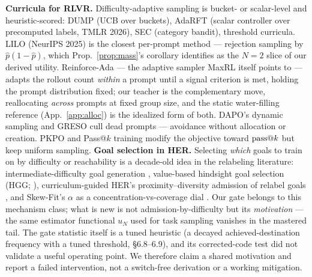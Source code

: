 \textbf{Curricula for RLVR.} Difficulty-adaptive sampling is bucket- or
scalar-level and heuristic-scored: DUMP (UCB over buckets), AdaRFT
(scalar controller over precomputed labels, TMLR 2026), SEC (category
bandit), threshold curricula. LILO (NeurIPS 2025) is the closest
per-prompt method --- rejection sampling by $\hat p(1-\hat p)$,
which Prop.~\ref{prop:mass}'s corollary identifies as the $N{=}2$ slice of
our derived utility. Reinforce-Ada \citep{reinforceada} --- the adaptive
sampler MaxRL itself points to --- adapts the rollout count \emph{within}
a prompt until a signal criterion is met, holding the prompt distribution
fixed; our teacher is the complementary move, reallocating \emph{across}
prompts at fixed group size, and the static water-filling reference
(App.~\ref{app:alloc}) is the idealized form of both. DAPO's dynamic sampling and
GRESO cull dead prompts --- avoidance without allocation or creation.
PKPO \citep{pkpo} and Pass@$k$ training \citep{passk}
modify the objective toward $\text{pass@}k$ but keep uniform sampling.
\textbf{Goal selection in HER.} Selecting \emph{which} goals to
train on by difficulty or reachability is a decade-old idea in the
relabeling literature: intermediate-difficulty goal generation
\citep{goalgan}, value-based hindsight goal selection (HGG;
\citealp{hgg}), curriculum-guided HER's proximity--diversity admission
of relabel goals \citep{cher}, and Skew-Fit's $\alpha$ as a
concentration-vs-coverage dial \citep{skewfit}. Our gate belongs to
this mechanism class; what is new is not admission-by-difficulty but
its \emph{motivation} --- the same estimator functional $u_N$ used for
task sampling vanishes in the mastered tail. The gate statistic itself
is a tuned heuristic (a decayed achieved-destination frequency with a
tuned threshold, \S 6.8--6.9), and its corrected-code test did not
validate a useful operating point. We therefore claim a shared
motivation and report a failed intervention, not a switch-free
derivation or a working mitigation.

